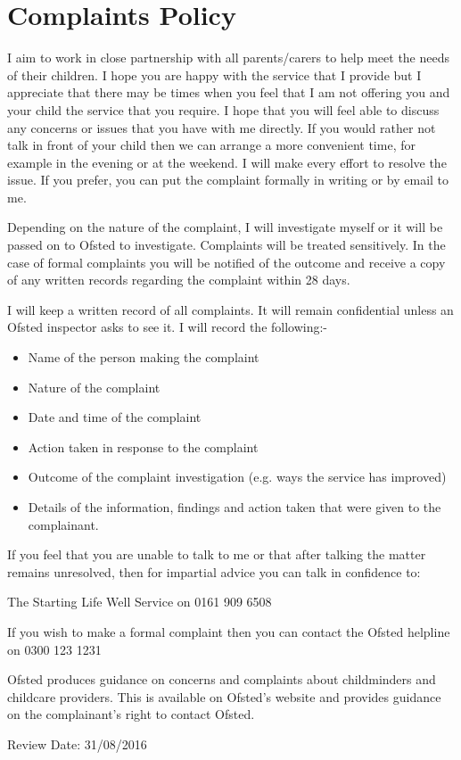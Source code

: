 

\section{Complaints Policy}

I aim to work in close partnership with all parents/carers to help meet
the needs of their children. I hope you are happy with the service that
I provide but I appreciate that there may be times when you feel that I
am not offering you and your child the service that you require. I hope
that you will feel able to discuss any concerns or issues that you have
with me directly. If you would rather not talk in front of your child
then we can arrange a more convenient time, for example in the evening
or at the weekend. I will make every effort to resolve the issue. If you
prefer, you can put the complaint formally in writing or by email to me.

Depending on the nature of the complaint, I will investigate myself or
it will be passed on to Ofsted to investigate. Complaints will be
treated sensitively. In the case of formal complaints you will be
notified of the outcome and receive a copy of any written records
regarding the complaint within 28 days.

I will keep a written record of all complaints. It will remain
confidential unless an Ofsted inspector asks to see it. I will record
the following:-

\begin{itemize}
\item
  Name of the person making the complaint~
\item
  Nature of the complaint~
\item
  Date and time of the complaint~
\item
  Action taken in response to the complaint~
\item
  Outcome of the complaint investigation (e.g. ways the service has
  improved)~
\item
  Details of the information, findings and action taken that were given
  to the complainant. ~
\end{itemize}

If you feel that you are unable to talk to me or that after talking the
matter remains unresolved, then for impartial advice you can talk in
confidence to:

The Starting Life Well Service on 0161 909 6508

If you wish to make a formal complaint then you can contact the Ofsted
helpline on 0300 123 1231

Ofsted produces guidance on concerns and complaints about childminders
and childcare providers. This is available on Ofsted's website and
provides guidance on the complainant's right to contact Ofsted.

Review Date: 31/08/2016


